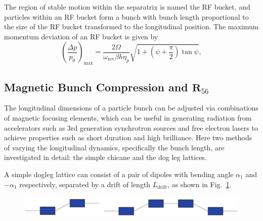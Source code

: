 \documentclass[../main.tex]{subfiles}
\begin{document}
The region of stable motion within the separatrix is named the RF bucket, and particles within an RF bucket form a bunch with bunch length proportional to the size of the RF bucket transformed to the longitudinal position. The maximum momentum deviation of an RF bucket is given by \cite{wolski2012longitudinal}
\begin{equation}
\left(\frac{\Delta p}{p_{0}}\right)_{\mathrm{max}} = \frac{2\Omega}{\omega_{\mathrm{rev}}\beta h\eta_{p}}\sqrt{1+\left(\psi+\frac{\pi}{2}\right)\tan\psi},
\label{eq:RF_bucket_momentum_deviation}    
\end{equation}

\subsection{Magnetic Bunch Compression and $\boldsymbol{R}_{56}$}

The longitudinal dimensions of a particle bunch can be adjusted via combinations of magnetic focusing elements, which can be useful in generating radiation from accelerators such as 3rd generation synchrotron sources and free electron lasers to achieve properties such as short duration and high brilliance. Here two methods of varying the longitudinal dynamics, specifically the bunch length, are investigated in detail: the simple chicane and the dog leg lattices.

A simple dogleg lattice can consist of a pair of dipoles with bending angle $\alpha_{1}$ and $-\alpha_{1}$ respectively, separated by a drift of length $L_{\mathrm{drift}}$, as shown in Fig.~\ref{fig:chicane_dogleg_schematic}.

\begin{figure}[!h]
\centering
\includegraphics[width=\textwidth]{Figures/Energy_Recovery_Linac_Design/chicane_dogleg.pdf}
\caption{}
\label{fig:chicane_dogleg_schematic}
\end{figure}
\end{document}
